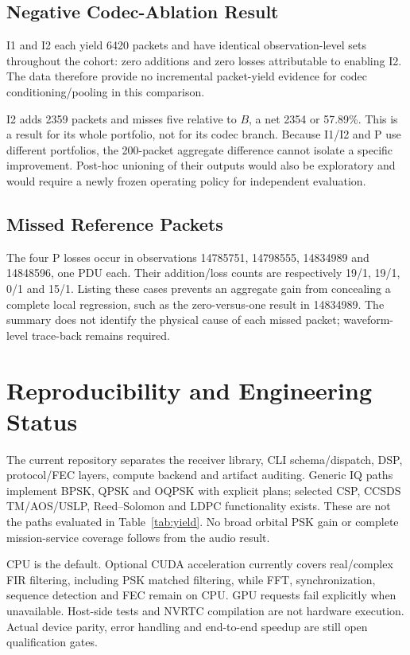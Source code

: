 \documentclass[journal]{IEEEtran}
\begin{document}
\subsection{Negative Codec-Ablation Result}
I1 and I2 each yield 6420 packets and have identical observation-level sets throughout the cohort: zero additions and zero losses attributable to enabling I2. The data therefore provide no incremental packet-yield evidence for codec conditioning/pooling in this comparison.

I2 adds 2359 packets and misses five relative to $B$, a net 2354 or 57.89\%. This is a result for its whole portfolio, not for its codec branch. Because I1/I2 and P use different portfolios, the 200-packet aggregate difference cannot isolate a specific improvement. Post-hoc unioning of their outputs would also be exploratory and would require a newly frozen operating policy for independent evaluation.

\subsection{Missed Reference Packets}
The four P losses occur in observations 14785751, 14798555, 14834989 and 14848596, one PDU each. Their addition/loss counts are respectively 19/1, 19/1, 0/1 and 15/1. Listing these cases prevents an aggregate gain from concealing a complete local regression, such as the zero-versus-one result in 14834989. The summary does not identify the physical cause of each missed packet; waveform-level trace-back remains required.

\section{Reproducibility and Engineering Status}
The current repository separates the receiver library, CLI schema/dispatch, DSP, protocol/FEC layers, compute backend and artifact auditing. Generic IQ paths implement BPSK, QPSK and OQPSK with explicit plans; selected CSP, CCSDS TM/AOS/USLP, Reed--Solomon and LDPC functionality exists. These are not the paths evaluated in Table~\ref{tab:yield}. No broad orbital PSK gain or complete mission-service coverage follows from the audio result.

CPU is the default. Optional CUDA acceleration currently covers real/complex FIR filtering, including PSK matched filtering, while FFT, synchronization, sequence detection and FEC remain on CPU. GPU requests fail explicitly when unavailable. Host-side tests and NVRTC compilation are not hardware execution. Actual device parity, error handling and end-to-end speedup are still open qualification gates.
\end{document}
